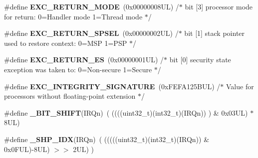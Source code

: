 \begin{DoxyCompactItemize}
\item 
\mbox{\label{group___c_m_s_i_s___core___n_v_i_c_functions_gabb65f847769a7807395b2739cc9702d0}} 
\#define {\bfseries E\+X\+C\+\_\+\+R\+E\+T\+U\+R\+N\+\_\+\+M\+O\+DE}~(0x00000008\+U\+L)     /$\ast$ bit \mbox{[}3\mbox{]} processor mode for return\+: 0=\+Handler mode 1=\+Thread mode      $\ast$/
\item 
\mbox{\label{group___c_m_s_i_s___core___n_v_i_c_functions_ga686922b26c29eac540f53a6213627466}} 
\#define {\bfseries E\+X\+C\+\_\+\+R\+E\+T\+U\+R\+N\+\_\+\+S\+P\+S\+EL}~(0x00000002\+U\+L)     /$\ast$ bit \mbox{[}1\mbox{]} stack pointer used to restore context\+: 0=\+M\+S\+P 1=\+P\+S\+P           $\ast$/
\item 
\mbox{\label{group___c_m_s_i_s___core___n_v_i_c_functions_gac939dbf69d3063c76a28516a4ae84db7}} 
\#define {\bfseries E\+X\+C\+\_\+\+R\+E\+T\+U\+R\+N\+\_\+\+ES}~(0x00000001\+U\+L)     /$\ast$ bit \mbox{[}0\mbox{]} security state exception was taken to\+: 0=\+Non-\/secure 1=\+Secure $\ast$/
\item 
\mbox{\label{group___c_m_s_i_s___core___n_v_i_c_functions_ga7d1b21b2d863ccd9e23a3295b3173155}} 
\#define {\bfseries E\+X\+C\+\_\+\+I\+N\+T\+E\+G\+R\+I\+T\+Y\+\_\+\+S\+I\+G\+N\+A\+T\+U\+RE}~(0x\+F\+E\+F\+A125\+B\+U\+L)     /$\ast$ Value for processors without floating-\/point extension                $\ast$/
\item 
\mbox{\label{group___c_m_s_i_s___core___n_v_i_c_functions_ga53c75b28823441c6153269f0ecbed878}} 
\#define {\bfseries \+\_\+\+B\+I\+T\+\_\+\+S\+H\+I\+FT}(I\+R\+Qn)~(  ((((uint32\+\_\+t)(int32\+\_\+t)(I\+R\+Qn))         )      \&  0x03\+U\+L) $\ast$ 8\+U\+L)
\item 
\mbox{\label{group___c_m_s_i_s___core___n_v_i_c_functions_gaee4f7eb5d7e770ad51489dbceabb1755}} 
\#define {\bfseries \+\_\+\+S\+H\+P\+\_\+\+I\+DX}(I\+R\+Qn)~( (((((uint32\+\_\+t)(int32\+\_\+t)(I\+R\+Qn)) \& 0x0\+F\+U\+L)-\/8\+U\+L) $>$$>$    2\+U\+L)      )
\item 
\mbox{\label{group___c_m_s_i_s___core___n_v_i_c_functions_ga370ec4b1751a6a889d849747df3763a9}} 
$$
\end{DoxyCompactItemize}
